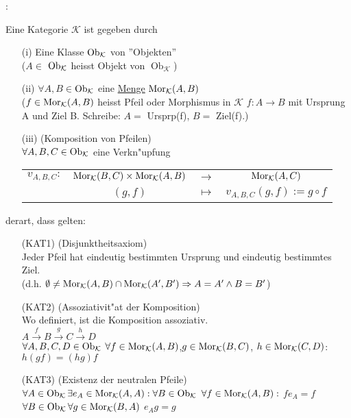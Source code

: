 :{Eine Kategorie $\mathcal{K}$ ist gegeben durch
 \begin{enumerate}
 \item[(i)] Eine Klasse $\operatorname{Ob}_{\mathcal{K}}$ von ''Objekten''\\
 ($A\in$ $\operatorname{Ob}_{\mathcal{K}}$ heisst Objekt von $\operatorname{Ob}_{\mathcal{K}}$)
 \item[(ii)] $\forall A,B\in $$\operatorname{Ob}_{\mathcal{K}}$ eine \underline{Menge}
 $\Mor(K;A;B)$ \\
 ($f\in \Mor(K;A;B)$ heisst Pfeil oder Morphismus in $\mathcal{K}$
 $f: A\longrightarrow B$ mit Ursprung A und Ziel B. Schreibe: $A= $ Ursprp(f), $B=$ Ziel(f).)
 \item[(iii)] (Komposition von Pfeilen)\\
 $\forall A,B,C \in \operatorname{Ob}_{\mathcal{K}}$ eine Verkn"upfung \\
 \begin{tabular}{cccc}
  $v_{A,B,C}:$ & $\Mor(K;B;C)\times \Mor(K;A;B)$ & $\longrightarrow$ & $ \Mor(K;A;C) $\\
               & $(g,f)$                         & $\mapsto$         & $v_{A,B,C}(g,f):=g \circ f$
 \end{tabular}
 \end{enumerate}
 derart, dass gelten: \\
\begin{enumerate}
\item[(KAT1)] (Disjunktheitsaxiom)\\
Jeder Pfeil hat eindeutig bestimmten Ursprung und eindeutig bestimmtes Ziel.\\
(d.h. $\emptyset \neq \Mor(K;A;B) \cap \Mor(K;A';B') \Rightarrow A=A' \land B=B'$)
\item[(KAT2)] (Assoziativit"at der Komposition)\\
Wo definiert, ist die Komposition assoziativ.\\
$A\stackrel{f}{\longrightarrow} B\stackrel{g}{\longrightarrow} C\stackrel{h}{\longrightarrow}D$ \\
$\forall A,B,C,D\in \operatorname{Ob}_{\mathcal{K}}$ $\forall f\in \Mor(K;A;B)$,$g\in \Mor(K;B;C)$,
$h \in \Mor(K;C;D)$: $h(gf)=(hg)f$
\item[(KAT3)](Existenz der neutralen Pfeile)\\
$\forall A\in \Ob{K} \exists e_A\in \Mor(K;A;A):\forall B\in \Ob{K} $
$\forall f\in \Mor(K;A;B):$ $fe_A=f$ \\
$\forall B\in \Ob{K} \forall g\in \Mor(K;B;A)$
$e_Ag=g$\\
\end{enumerate}  
   }
